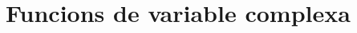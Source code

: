 \documentclass[../Apunts.tex]{subfiles}
\begin{document}
%		
%		

\section{Funcions de variable complexa}
\end{document}
